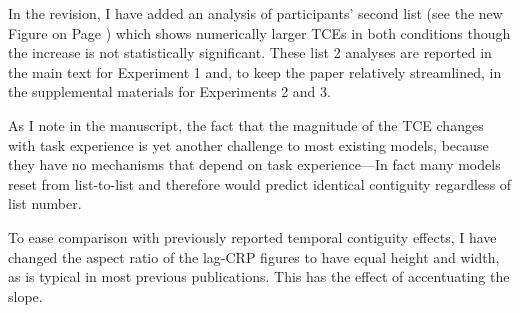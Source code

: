 \documentclass[12pt]{article}
\begin{document}
\begin{enumerate}
	In the revision, I have added an analysis of participants' second list (see the new Figure on Page \pageref{TODO-6}) which shows numerically larger TCEs in both conditions though the increase is not statistically significant. These list 2 analyses are reported in the main text for Experiment 1 and, to keep the paper relatively streamlined, in the supplemental materials for Experiments 2 and 3.

	As I note in the manuscript, the fact that the magnitude of the TCE changes with task experience is yet another challenge to most existing models, because they have no mechanisms that depend on task experience---In fact many models reset from list-to-list and therefore would predict identical contiguity regardless of list number.

	To ease comparison with previously reported temporal contiguity effects, I have changed the aspect ratio of the lag-CRP figures to have equal height and width, as is typical in most previous publications. This has the effect of accentuating the slope. 



\end{enumerate}
\end{document}
